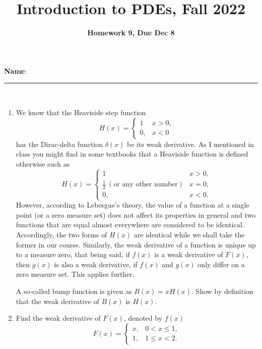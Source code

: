 \documentclass[6pt]{article}
\title{Introduction to PDEs, Fall 2022}
\author{\textbf{Homework 9, Due Dec 8}}
\date{}
\numberwithin{equation}{section}
\begin{document}
\maketitle

\textbf{Name}:\rule{1 in}{0.001 in} \\
\begin{enumerate}

\item We know that the Heaviside step function
\begin{equation}H(x)=
\left\{
\begin{array}{ll}
1& x> 0, \\
0,&x<0
\end{array}
\right.
\end{equation}
has the Dirac-delta function $\delta(x)$ be its weak derivative.  As I mentioned in class you might find in some textbooks that a Heaviside function is defined otherwise such as
\begin{equation}H(x)=
\left\{
\begin{array}{ll}
1& x> 0, \\
\frac{1}{2}~(\text{or any other number})& x= 0, \\
0,&x<0.
\end{array}
\right.
\end{equation}
However, according to Lebesgue's theory, the value of a function at a single point (or a zero
measure set) does not affect its properties in general and two functions that are equal almost everywhere are
considered to be identical.  Accordingly, the two forms of $H(x)$ are identical while we shall take the former in our course.  Similarly, the weak derivative of a function is unique up to a measure zero, that being said, if $f(x)$ is a weak derivative of $F(x)$, then $g(x)$ is also a weak derivative, if $f(x)$ and $g(x)$ only differ on a zero measure set.  This applies further.

A so-called bump function is given as $B(x)=xH(x)$.  Show by definition that the weak derivative of $B(x)$ is $H(x)$.

\item Find the weak derivative of $F(x)$, denoted by $f(x)$
\begin{equation}
F(x)=\left\{
\begin{array}{ll}
x,&0<x\leq1,\\
1,&1\leq x<2.
\end{array}
\right.
\end{equation}


\end{enumerate}
\end{document}

